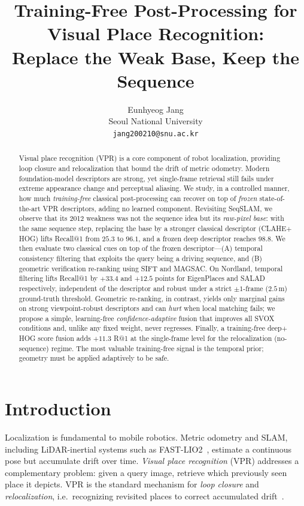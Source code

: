 \documentclass[10pt,twocolumn,letterpaper]{article}
\title{Training-Free Post-Processing for Visual Place Recognition:\\
Replace the Weak Base, Keep the Sequence}
\author{Eunhyeog Jang\\
Seoul National University\\
{\tt\small jang200210@snu.ac.kr}
}
\begin{document}
\maketitle

\begin{abstract}
Visual place recognition (VPR) is a core component of robot localization,
providing loop closure and relocalization that bound the drift of metric
odometry. Modern foundation-model descriptors are strong, yet single-frame
retrieval still fails under extreme appearance change and perceptual aliasing.
We study, in a controlled manner, how much \emph{training-free} classical
post-processing can recover on top of \emph{frozen} state-of-the-art VPR
descriptors, adding no learned component. Revisiting SeqSLAM, we observe that
its 2012 weakness was not the sequence idea but its \emph{raw-pixel base}: with
the same sequence step, replacing the base by a stronger classical descriptor
(CLAHE${+}$HOG) lifts Recall@1 from $25.3$ to $96.1$, and a frozen deep
descriptor reaches $98.8$. We then evaluate two classical cues on top of the
frozen descriptor---(A) temporal consistency filtering that exploits the query
being a driving sequence, and (B) geometric verification re-ranking using SIFT
and MAGSAC. On Nordland, temporal filtering lifts Recall@1 by $+33.4$ and
$+12.5$ points for EigenPlaces and SALAD respectively, independent of the
descriptor and robust under a strict $\pm1$-frame ($2.5\,$m) ground-truth
threshold. Geometric re-ranking, in contrast, yields only marginal gains on
strong viewpoint-robust descriptors and can \emph{hurt} when local matching
fails; we propose a simple, learning-free \emph{confidence-adaptive} fusion that
improves all SVOX conditions and, unlike any fixed weight, never regresses.
Finally, a training-free deep${+}$HOG score fusion adds $+11.3$ R@1 at the
single-frame level for the relocalization (no-sequence) regime. The most
valuable training-free signal is the temporal prior; geometry must be applied
adaptively to be safe.
\end{abstract}

\section{Introduction}
\label{sec:intro}
Localization is fundamental to mobile robotics. Metric odometry and SLAM,
including LiDAR-inertial systems such as FAST-LIO2~\cite{xu2022fastlio2},
estimate a continuous pose but accumulate drift over time. \emph{Visual place
recognition} (VPR) addresses a complementary problem: given a query image,
retrieve which previously seen place it depicts. VPR is the standard mechanism
for \emph{loop closure} and \emph{relocalization}, i.e.\ recognizing revisited
places to correct accumulated drift~\cite{milford2012seqslam}.
\end{document}
